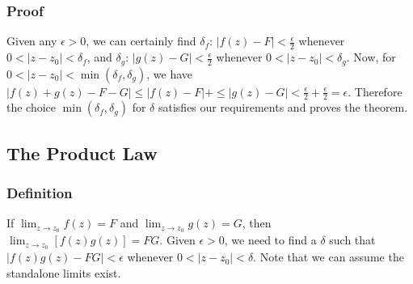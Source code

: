 \documentclass[../main.tex]{subfiles}
\begin{document}
        \subsubsection{Proof}
            Given any $\epsilon>0$, we can certainly find $\delta_{f}$: $|f(z)-F|<\frac{\epsilon}{2}$ whenever $0<|z-z_{0}|<\delta_{f}$,
            and $\delta_{g}$: $|g(z)-G|<\frac{\epsilon}{2}$ whenever $0<|z-z_{0}|<\delta_{g}$. Now, for $0<|z-z_{0}|<\min(\delta_{f}, \delta_{g})$, we have 
            $|f(z)+g(z)-F-G|\leq|f(z)-F|+\leq|g(z)-G|<\frac{\epsilon}{2}+\frac{\epsilon}{2}=\epsilon$.
            Therefore the choice $\min(\delta_{f}, \delta_{g})$ for $\delta$ satisfies our requirements and proves the theorem.

    \subsection{The Product Law}
        \subsubsection{Definition}
            If $\lim_{z\rightarrow z_{0}}f(z)=F$ and $\lim_{z\rightarrow z_{0}}g(z)=G$, then $\lim_{z\rightarrow z_{0}}\left[f(z)g(z)\right]=FG$.
            Given $\epsilon >0$, we need to find a $\delta$ such that $|f(z)g(z)-FG|<\epsilon$ whenever $0<|z-z_{0}|<\delta$. Note that we can assume the 
            standalone limits exist.
\end{document}
